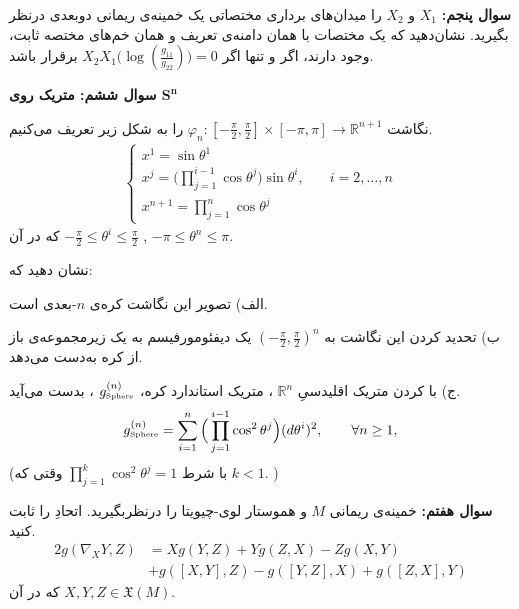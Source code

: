 \documentclass{article}
\newenvironment{parind}{%
	\par%
	\medskip
	\leftskip=0mm\rightskip=7mm
	\noindent\ignorespaces}{%
	\par\medskip}
\begin{document}
	\vspace{-1em}
	\textbf{سوال پنجم:}
	$X_1$ 
	و
	$X_2$
	را میدان‌های برداری مختصاتی یک خمینه‌ی ریمانی دوبعدی درنظر بگیرید. نشان‌دهید که یک مختصات 
	با همان دامنه‌ی تعریف و همان خم‌های مختصه ثابت، وجود دارند، اگر و تنها اگر 
	$X_2X_1 \Big(\log(\frac{g_{11}}{g_{22}})\Big) =0$
	برقرار باشد.
	
	\vspace{-1em}
	\endline
	
	\vspace{-1em}
	\textbf{سوال ششم: متریک روی 
	$\mathbf{S^n}$}
	
	نگاشت
	$\varphi_n : [-\frac{\pi}{2},\frac{\pi}{2}] \times [-\pi,\pi] \xrightarrow{} \mathbb{R}^{n+1}$
	را به شکل زیر تعریف می‌کنیم.
	\begin{equation*}
		\begin{aligned}
			\begin{cases}
				x^1  = \sin \theta^1 \\	
				x^j = \Big(
				\prod_{j=1}^{i-1} \cos \theta^j
				\Big)	\sin \theta^i, & \quad i=2,\dots,n
				\\
				x^{n+1} = \prod_{j=1}^{n} \cos\theta^j		
			\end{cases}
		\end{aligned}
	\end{equation*}
	که در آن
	$-\frac{\pi}{2} \leq \theta^i \leq \frac{\pi}{2}$ , $ -\pi \leq \theta^n \leq \pi$.
	
نشان دهید که:
\begin{parind}
	الف) تصویر این نگاشت کره‌ی 
	$n$-بعدی است.
	
	ب) تحدید کردن این نگاشت به 
	$(-\frac{\pi}{2},\frac{\pi}{2})^n$
	 یک دیفئومورفیسم به یک زیرمجموعه‌ی باز از کره به‌دست می‌دهد.
	 
	 ج) با 
	 کردن متریک اقلیدسیِ
	 $\mathbb{R}^n$
	 ، متریک استاندارد کره،
	 $g^{(n)}_{\text{\tiny Sphere}}$
	 ،
	 بدست می‌آید.
	 \[
	 g^{(n)}_{\text{\tiny Sphere}} = \sum_{i=1}^{n} \Big(
	 \prod_{j=1}^{i-1} \cos^2 \theta^j
	 \Big) (d\theta^i)^2, \qquad \forall n\geq 1,
	 \]
	 (با شرط
	 $\prod_{j=1}^{k} \cos^2 \theta^j = 1$
	  وقتی که 
	  $k<1$.
	 )
\end{parind}
	
	\vspace{-1em}
	\endline
	
	\vspace{-1em}
	\textbf{سوال هفتم:}
	خمینه‌ی ریمانی 
	$M$ و هموستار
	لوی-چیویتا را درنظربگیرید.  اتحادِ
	را ثابت کنید.
	\begin{equation*}
		\begin{aligned}
				2g(\nabla_XY,Z) &= Xg(Y,Z) + Y g(Z,X) - Z g(X,Y) \\ &+ g([X,Y],Z) - g([Y,Z],X) + g([Z,X],Y)
		\end{aligned}
	\end{equation*}
	که در آن 
	$X,Y,Z \in \mathfrak{X}(M)$.
	
\end{document}
